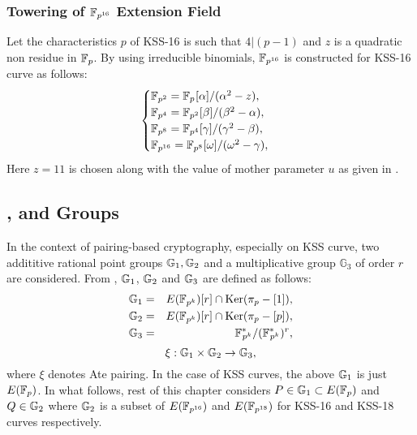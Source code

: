 \subsubsection{Towering of \texorpdfstring{$\mathbb{F}_{p^{16}}$}{} Extension Field}
Let the characteristics $p$ of KSS-16 is such that  $4|(p-1)$  and $z$ is a quadratic non residue in ${\mathbb{F}}_{p}$. By using irreducible binomials, $\mathbb{F}_{p^{16}}$ is constructed for KSS-16 curve  as follows:
\begin{equation}\label{eq_KSS16_towering_towering_chap_ijnc2017}
\begin{cases}
{\mathbb{F}}_{p^{2}} = {\mathbb{F}}_{p^{}}[\alpha]/(\alpha^2-z),  \\ 
{\mathbb{F}}_{p^{4}} = {\mathbb{F}}_{p^{2}}[\beta]/(\beta^2-\alpha),  \\ 
{\mathbb{F}}_{p^{8}} = {\mathbb{F}}_{p^{4}}[\gamma]/(\gamma^2-\beta), \\ 
{\mathbb{F}}_{p^{16}} = {\mathbb{F}}_{p^{8}}[\omega]/(\omega^2-\gamma), \\ 
\end{cases}
\end{equation}
Here $z = 11$ is chosen along with the value of mother parameter $u$ as given in .

\subsection{\texorpdfstring{}{G1}, \texorpdfstring{}{G2} and \texorpdfstring{}{G3} Groups} In the context of pairing-based cryptography, especially on KSS curve, two addititive rational point groups ${\mathbb{G}}_{1}, {\mathbb{G}}_{2}$ and a multiplicative group $\mathbb{G}_3$ of order $r$ are considered. From \cite{PAIRING:MANS13},  ${\mathbb{G}}_{1}$, ${\mathbb{G}}_{2}$ and ${\mathbb{G}}_{3}$ are defined as follows:
\begin{eqnarray}\label{eq:groupsg1g2g3_chap_ijnc2017}
{\mathbb{G}}_{1} & = &  E({\mathbb{F}}_{p^{k}}) [r] \cap \text{Ker}(\pi_p - [1]), \nonumber \\
{\mathbb{G}}_{2} & = &  E({\mathbb{F}}_{p^{k}}) [r] \cap \text{Ker}(\pi_p - [p]), \nonumber \\
{\mathbb{G}}_{3} & = & {{\mathbb{F}}^{\ast}}_{\!\!\!p^{k}}/({{\mathbb{F}}^{\ast}}_{\!\!\!p^{k}})^r, \nonumber
\end{eqnarray}
\begin{equation}
\xi : {\mathbb{G}}_{1} \times {\mathbb{G}}_{2} \rightarrow {\mathbb{G}}_{3},
\end{equation}
where $\xi$ denotes Ate pairing. In the case of KSS curves, the above ${\mathbb{G}}_{1}$ is just $E(\mathbb{F}_p)$. In what follows, rest of this chapter considers 
$P \in {\mathbb{G}}_{1} \subset E(\mathbb{F}_p)$ and  $Q \in {\mathbb{G}}_{2}$ where  ${\mathbb{G}}_{2}$ is a subset of $E(\mathbb{F}_{p^{16}})$ and $E(\mathbb{F}_{p^{18}})$ for KSS-16 and KSS-18 curves respectively. 


